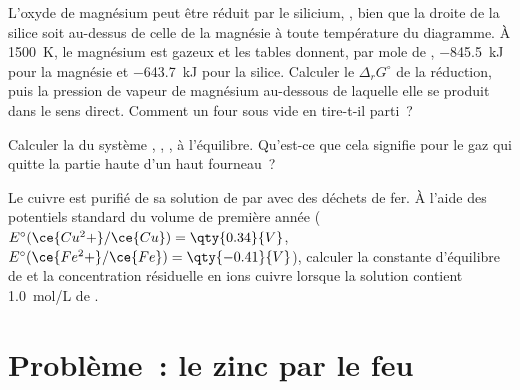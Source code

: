 \begin{exercise}[$\star\star\star$]\label{exo:b2:ellingham:10}
L'oxyde de magnésium peut être réduit par le silicium, , bien que
la droite de la silice soit au-dessus de celle de la magnésie à toute température du
diagramme. À \qty{1500}{K}, le magnésium est gazeux et les tables donnent, par mole de
, \qty{-845.5}{kJ} pour la magnésie et \qty{-643.7}{kJ} pour la silice.
Calculer le $\Delta_r G^\circ$ de la réduction, puis la pression de vapeur de magnésium
au-dessous de laquelle elle se produit dans le sens direct. Comment un four sous vide en tire-t-il parti~?
\end{exercise}

\begin{exercise}[$\star\star\star$]\label{exo:b2:ellingham:11}
Calculer la  du système , , ,
 à l'équilibre. Qu'est-ce que cela signifie pour le gaz qui quitte la partie haute
d'un haut fourneau~?
\end{exercise}

\begin{exercise}[$\star\star\star$]\label{exo:b2:ellingham:12}
Le cuivre est purifié de sa solution de  par  avec des déchets de fer.
À l'aide des potentiels standard du volume de première année ($E^\circ(\ce{Cu^2+}/\ce{Cu})
= \qty{0.34}{V}$, $E^\circ(\ce{Fe^2+}/\ce{Fe}) = \qty{-0.41}{V}$), calculer la
constante d'équilibre de  et la concentration résiduelle
en ions cuivre lorsque la solution contient \qty{1.0}{mol/L} de
.
\end{exercise}

\section{Problème~: le zinc par le feu}

